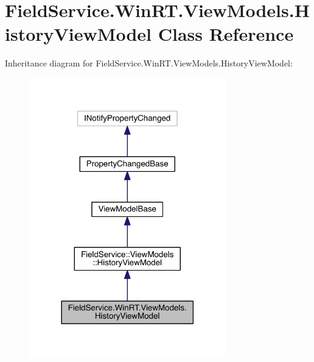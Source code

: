 \hypertarget{class_field_service_1_1_win_r_t_1_1_view_models_1_1_history_view_model}{\section{Field\+Service.\+Win\+R\+T.\+View\+Models.\+History\+View\+Model Class Reference}
\label{class_field_service_1_1_win_r_t_1_1_view_models_1_1_history_view_model}
}


Inheritance diagram for Field\+Service.\+Win\+R\+T.\+View\+Models.\+History\+View\+Model\+:
\nopagebreak
\begin{figure}[H]
\begin{center}
\leavevmode
\includegraphics[width=242pt]{class_field_service_1_1_win_r_t_1_1_view_models_1_1_history_view_model__inherit__graph}
\end{center}
\end{figure}


